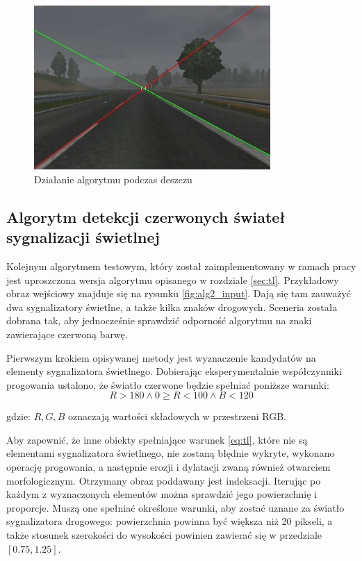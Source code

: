 \begin{figure}
  \centering
  \includegraphics[width=9cm]{img/alg1_rain.jpg}
  \caption{Działanie algorytmu podczas deszczu}
  \label{fig:alg1_rain}
\end{figure}


\subsection{Algorytm detekcji czerwonych świateł sygnalizacji świetlnej} 

Kolejnym algorytmem testowym, który został zaimplementowany w ramach pracy jest uproszczona wersja algorytmu opisanego w rozdziale \ref{sec:tl}. 
Przykładowy obraz wejściowy znajduje się na rysunku \ref{fig:alg2_input}. 
Dają się tam zauważyć dwa sygnalizatory świetlne, a także kilka znaków drogowych. 
Sceneria została dobrana tak, aby jednocześnie sprawdzić odporność algorytmu na znaki zawierające czerwoną barwę.

Pierwszym krokiem opisywanej metody jest wyznaczenie kandydatów na elementy sygnalizatora świetlnego. 
Dobierając eksperymentalnie współczynniki progowania ustalono, że światło czerwone będzie spełniać poniższe warunki:
\begin{equation}
\label{eq:tl}
R>180 \wedge 0 \geq R<100 \wedge B < 120
\end{equation}

gdzie: $R, G, B$ oznaczają wartości składowych w przestrzeni RGB.

Aby zapewnić, że inne obiekty spełniające warunek \ref{eq:tl}, które nie są elementami sygnalizatora świetlnego, nie zostaną błędnie wykryte, wykonano operację progowania, a następnie erozji i dylatacji zwaną również otwarciem morfologicznym. %
Otrzymany obraz poddawany jest indeksacji. 
Iterując po każdym z wyznaczonych elementów można sprawdzić jego powierzchnię i proporcje. 
Muszą one spełniać określone warunki, aby zostać uznane za światło sygnalizatora drogowego: powierzchnia powinna być większa niż 20 pikseli, a także stosunek szerokości do wysokości powinien zawierać się w przedziale $[0.75, 1.25]$.

